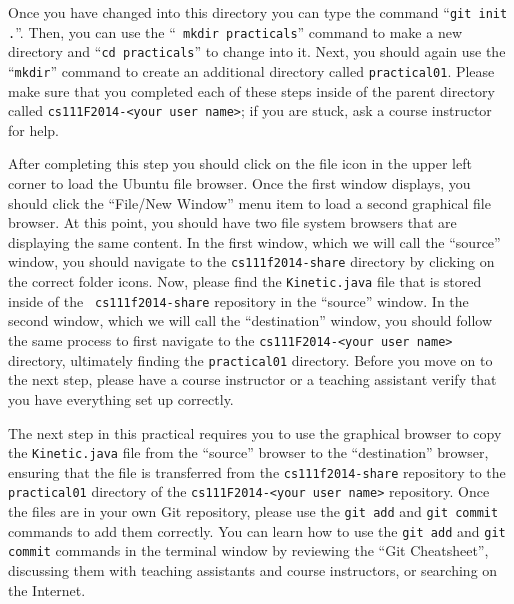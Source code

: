 
Once you have changed into this directory you can type the command ``{\tt git init .}''. Then, you can use the ``{\tt
  mkdir practicals}'' command to make a new directory and ``{\tt cd practicals}'' to change into it.  Next, you
should again use the ``{\tt mkdir}'' command to create an additional directory called {\tt practical01}.  Please make
sure that you completed each of these steps inside of the parent directory called {\tt cs111F2014-<your user name>}; if
you are stuck, ask a course instructor for help.

After completing this step you should click on the file icon in the upper left corner to load the Ubuntu file browser.
Once the first window displays, you should click the ``File/New Window'' menu item to load a second graphical file
browser. At this point, you should have two file system browsers that are displaying the same content.  In the first
window, which we will call the ``source'' window, you should navigate to the {\tt cs111f2014-share} directory by
clicking on the correct folder icons.  Now, please find the {\tt Kinetic.java} file that is stored inside of the {\tt
  cs111f2014-share} repository in the ``source'' window. In the second window, which we will call the ``destination''
window, you should follow the same process to first navigate to the {\tt cs111F2014-<your user name>} directory,
ultimately finding the {\tt practical01} directory. Before you move on to the next step, please have a course instructor
or a teaching assistant verify that you have everything set up correctly.

The next step in this practical requires you to use the graphical browser to copy the {\tt Kinetic.java} file from the
``source'' browser to the ``destination'' browser, ensuring that the file is transferred from the {\tt cs111f2014-share}
repository to the {\tt practical01} directory of the {\tt cs111F2014-<your user name>} repository.  Once the files are
in your own Git repository, please use the {\tt git add} and {\tt git commit} commands to add them correctly. You can learn how to use the {\tt git add} and {\tt git commit} commands in the terminal window by reviewing the ``Git Cheatsheet'', discussing them with teaching assistants and course instructors, or searching on the Internet.


